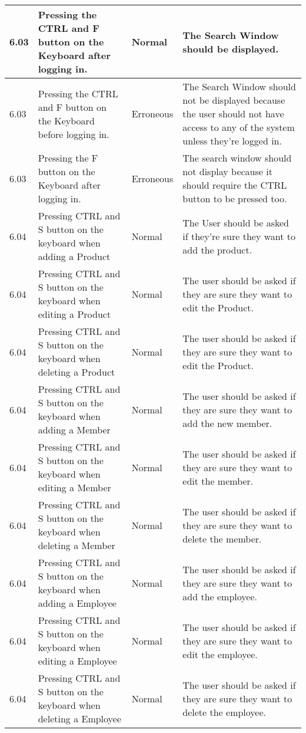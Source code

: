 \begin{flushleft}
\begin{longtable}{|p{1.5cm}|p{2.5cm}|p{2cm}|p{4.5cm}|}
	\rowcolor{light-grey}6.03 & Pressing the CTRL and F button on the Keyboard after logging in. & Normal & The Search Window should be displayed.\\ \hline
	\rowcolor{light-grey}6.03 & Pressing the CTRL and F button on the Keyboard before logging in. & Erroneous & The Search Window should not be displayed because the user should not have access to any of the system unless they're logged in. \\ \hline
	\rowcolor{light-grey}6.03 & Pressing the F button on the Keyboard after logging in. & Erroneous &  The search window should not display because it should require the CTRL button to be pressed too. \\ \hline
	\rowcolor{light-grey}6.04 & Pressing CTRL and S button on the keyboard when adding a Product & Normal &  The User should be asked if they're sure they want to add the product. \\ \hline
	\rowcolor{light-grey}6.04 & Pressing CTRL and S button on the keyboard when editing a Product & Normal & The user should be asked if they are sure they want to edit the Product. \\ \hline
	\rowcolor{light-grey}6.04 & Pressing CTRL and S button on the keyboard when deleting a Product & Normal & The user should be asked if they are sure they want to edit the Product. \\ \hline
	\rowcolor{light-grey}6.04 & Pressing CTRL and S button on the keyboard when adding a Member & Normal &  The user should be asked if they are sure they want to add the new member. \\ \hline
	\rowcolor{light-grey}6.04 & Pressing CTRL and S button on the keyboard when editing a Member & Normal &  The user should be asked if they are sure they want to edit the member. \\ \hline
	\rowcolor{light-grey}6.04 & Pressing CTRL and S button on the keyboard when deleting a Member & Normal &  The user should be asked if they are sure they want to delete the member. \\ \hline
	\rowcolor{light-grey}6.04 & Pressing CTRL and S button on the keyboard when adding a Employee& Normal & The user should be asked if they are sure they want to add the employee. \\ \hline
	\rowcolor{light-grey}6.04 & Pressing CTRL and S button on the keyboard when editing a Employee& Normal & The user should be asked if they are sure they want to edit the employee. \\ \hline
	\rowcolor{light-grey}6.04 & Pressing CTRL and S button on the keyboard when deleting a Employee& Normal & The user should be asked if they are sure they want to delete the employee. \\ \hline

\end{longtable}
\end{flushleft}
